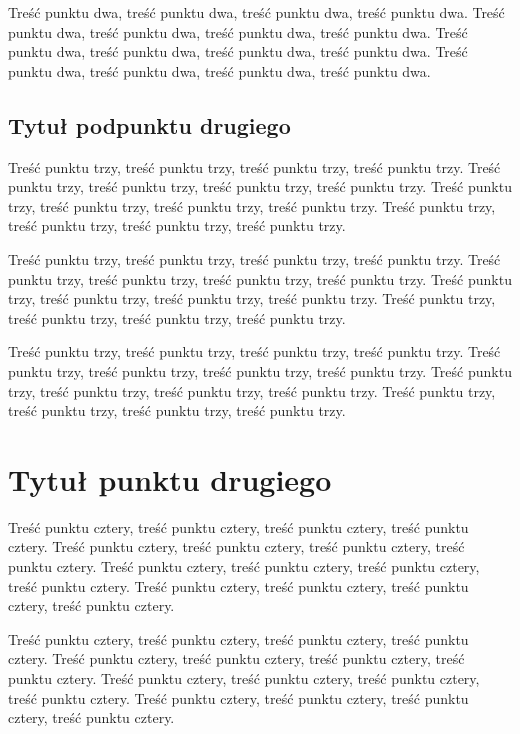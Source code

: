\documentclass[brudnopis,xodstep]{wkmgr}
\begin{document}
Treść punktu dwa, treść punktu dwa, treść punktu dwa, treść punktu dwa.
Treść punktu dwa, treść punktu dwa, treść punktu dwa, treść punktu dwa.
Treść punktu dwa, treść punktu dwa, treść punktu dwa, treść punktu dwa.
Treść punktu dwa, treść punktu dwa, treść punktu dwa, treść punktu dwa.

\subsection{Tytuł podpunktu drugiego}


Treść punktu trzy, treść punktu trzy, treść punktu trzy, treść punktu trzy.
Treść punktu trzy, treść punktu trzy, treść punktu trzy, treść punktu trzy.
Treść punktu trzy, treść punktu trzy, treść punktu trzy, treść punktu trzy.
Treść punktu trzy, treść punktu trzy, treść punktu trzy, treść punktu trzy.

Treść punktu trzy, treść punktu trzy, treść punktu trzy, treść punktu trzy.
Treść punktu trzy, treść punktu trzy, treść punktu trzy, treść punktu trzy.
Treść punktu trzy, treść punktu trzy, treść punktu trzy, treść punktu trzy.
Treść punktu trzy, treść punktu trzy, treść punktu trzy, treść punktu trzy.

Treść punktu trzy, treść punktu trzy, treść punktu trzy, treść punktu trzy.
Treść punktu trzy, treść punktu trzy, treść punktu trzy, treść punktu trzy.
Treść punktu trzy, treść punktu trzy, treść punktu trzy, treść punktu trzy.
Treść punktu trzy, treść punktu trzy, treść punktu trzy, treść punktu trzy.


\section{Tytuł punktu drugiego}

Treść punktu cztery, treść punktu cztery, treść punktu cztery, treść punktu cztery.
Treść punktu cztery, treść punktu cztery, treść punktu cztery, treść punktu cztery.
Treść punktu cztery, treść punktu cztery, treść punktu cztery, treść punktu cztery.
Treść punktu cztery, treść punktu cztery, treść punktu cztery, treść punktu cztery.

Treść punktu cztery, treść punktu cztery, treść punktu cztery, treść punktu cztery.
Treść punktu cztery, treść punktu cztery, treść punktu cztery, treść punktu cztery.
Treść punktu cztery, treść punktu cztery, treść punktu cztery, treść punktu cztery.
Treść punktu cztery, treść punktu cztery, treść punktu cztery, treść punktu cztery.
\end{document}
